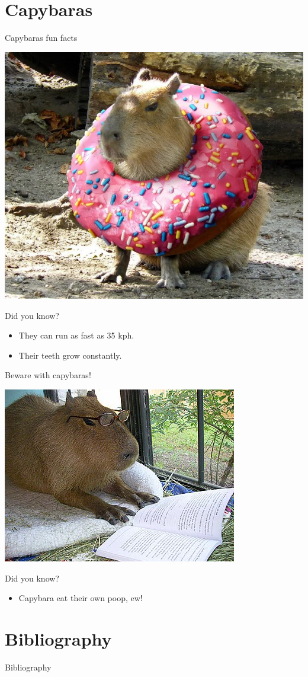 \documentclass[11pt]{beamer}
\begin{document}
\section{Capybaras}
\begin{frame}{Capybaras fun facts}
	\begin{center}
		\includegraphics[width = .50\textwidth]{capydonut.jpg}
	\end{center}
	\begin{block} {Did you know?}
		\begin{itemize}
			\item They can run as fast as 35 kph.
			\item Their teeth grow constantly.
		\end{itemize}
	\end{block}
\end{frame}


\begin{frame}{Beware with capybaras!}
	\begin{center}
		\includegraphics[width = .60\textwidth]{studybara.jpg}
	\end{center}
	\begin{alertblock} {Did you know?}
		\begin{itemize}
			\pause
			\item Capybara eat their own poop, ew!
		\end{itemize}
	\end{alertblock}
	\end{frame}
\section{Bibliography}
\begin{frame}{Bibliography}


\end{frame}
\end{document}
